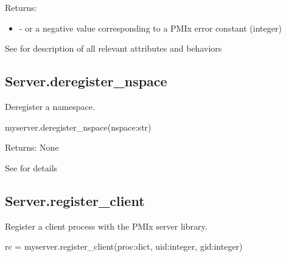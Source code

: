 Returns:

\begin{itemize}
    \item {} -  or a negative value corresponding to a PMIx error constant (integer)
\end{itemize}


See  for description of all relevant attributes and behaviors


\subsection{Server.deregister_nspace}

\summary Deregister a namespace.

\format

\pyspecificstart
\begin{codepar}
myserver.deregister_nspace(nspace:str)
\end{codepar}
\pyspecificend


\begin{arglist}
\end{arglist}

Returns: None


See  for details


\subsection{Server.register_client}

\summary
Register a client process with the PMIx server library.


\format

\pyspecificstart
\begin{codepar}
rc = myserver.register_client(proc:dict, uid:integer, gid:integer)
\end{codepar}
\pyspecificend


\begin{arglist}
\end{arglist}

